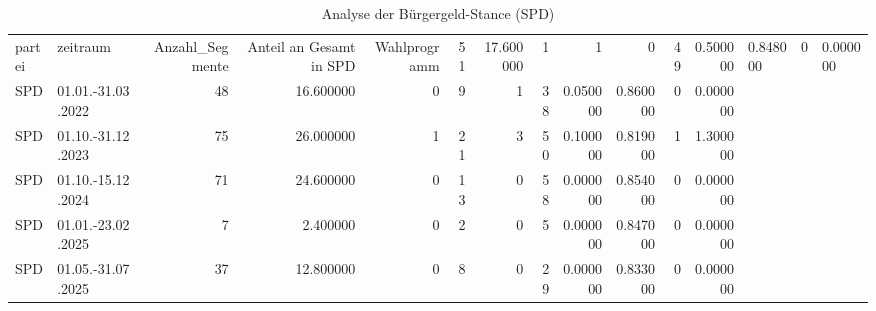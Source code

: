 \begin{table}
\caption{Analyse der Bürgergeld-Stance (SPD)}
\label{tab:meine_tabelle}
\begin{tabular}{llrrrrrrrrrr}
\toprule
partei & zeitraum & Anzahl_Segmente & Anteil an Gesamt in %
\midrule
SPD & Wahlprogramm & 51 & 17.600000 & 1 & 1 & 0 & 49 & 0.500000 & 0.848000 & 0 & 0.000000 \\
SPD & 01.01.-31.03.2022 & 48 & 16.600000 & 0 & 9 & 1 & 38 & 0.050000 & 0.860000 & 0 & 0.000000 \\
SPD & 01.10.-31.12.2023 & 75 & 26.000000 & 1 & 21 & 3 & 50 & 0.100000 & 0.819000 & 1 & 1.300000 \\
SPD & 01.10.-15.12.2024 & 71 & 24.600000 & 0 & 13 & 0 & 58 & 0.000000 & 0.854000 & 0 & 0.000000 \\
SPD & 01.01.-23.02.2025 & 7 & 2.400000 & 0 & 2 & 0 & 5 & 0.000000 & 0.847000 & 0 & 0.000000 \\
SPD & 01.05.-31.07.2025 & 37 & 12.800000 & 0 & 8 & 0 & 29 & 0.000000 & 0.833000 & 0 & 0.000000 \\
\bottomrule
\end{tabular}
\end{table}
